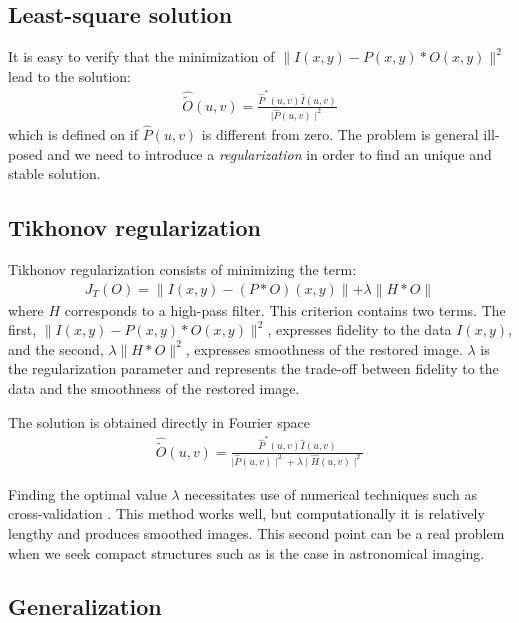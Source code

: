 \documentclass[11pt,a4paper]{article}
\begin{document}
\subsection{Least-square solution}
It is easy to verify that the minimization of 
$\parallel I(x,y) - P(x,y)* O(x,y) \parallel^2$
lead to the solution:
\begin{eqnarray}
\hat{\tilde{O}}(u,v)=\frac{\hat{P}^*(u,v)\hat{I}(u,v)}{ \mid \hat{P}(u,v) \mid^2}
 \end{eqnarray}
which is defined on if $\hat{P}(u,v)$ is different from zero. The problem is
general ill-posed and we need to introduce a {\em regularization} in order
to find an unique and stable solution.

\subsection{Tikhonov regularization}
Tikhonov regularization \cite{rest:tikhonov77} consists of minimizing the term:
\begin{eqnarray}
J_T(O) = \parallel I(x,y) - (P * O)(x,y) \parallel + \lambda \parallel H * O\parallel
 \label{eqn_ti}
\end{eqnarray}
 where $H$ corresponds to a high-pass filter. 
This criterion contains two terms. 
The first, $\parallel I(x,y) - P(x,y)* O(x,y) \parallel^2$, expresses
 fidelity to the data $I(x,y)$, and the second, 
$\lambda \parallel H * O\parallel^2$, expresses 
smoothness of the restored image. 
$\lambda$ is the
regularization parameter and represents the trade-off between
fidelity to the data and the smoothness of the restored image. 

The solution is obtained directly in Fourier space
\begin{eqnarray}
\hat{\tilde{O}}(u,v)  = \frac{\hat{P}^*(u,v) \hat{I}(u,v)}{\mid \hat{P}(u,v) \mid^2 + \lambda \mid \hat{H}(u,v) \mid^2}
\end{eqnarray}

Finding the optimal value $\lambda$ necessitates use of numerical techniques such as
cross-validation \cite{rest:golub79,rest:galatsanos92}. 
This method works well, but computationally it is relatively lengthy
and produces smoothed images. This second point can be a real problem
when we seek compact structures such as is the case in astronomical imaging.

\subsection{Generalization}
\end{document}
